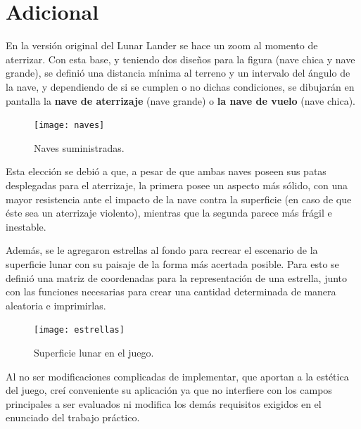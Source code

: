 \documentclass[a4paper, 12pt, spanish]{article}
\begin{document}
\section*{Adicional}
En la versión original del Lunar Lander se hace un zoom al momento de aterrizar. Con esta base, y teniendo dos diseños
para la figura (nave chica y nave grande), se definió una distancia mínima al terreno y un intervalo del ángulo de la nave,
y dependiendo de si se cumplen o no dichas condiciones, se dibujarán en pantalla la \textbf{nave de aterrizaje} (nave grande) 
o \textbf{la nave de vuelo} (nave chica). \bigskip

\begin{figure}[h]
 	\centering
	\texttt{[image: naves]} 
	\caption{Naves suministradas.}
\end{figure}

\bigskip
Esta elección se debió a que, a pesar de que ambas naves poseen sus patas desplegadas para el aterrizaje,
la primera posee un aspecto más sólido, con una mayor resistencia ante el impacto de la nave
contra la superficie (en caso de que éste sea un aterrizaje violento), mientras que la segunda parece más frágil e inestable.
\newline

Además, se le agregaron estrellas al fondo para recrear el escenario de la superficie lunar con su paisaje de la forma más
acertada posible. Para esto se definió una matriz de coordenadas para la representación de una estrella, junto con las funciones necesarias
para crear una cantidad determinada de manera aleatoria e imprimirlas.

\begin{figure}[h!]
 	\centering
	\texttt{[image: estrellas]} 
	\caption{Superficie lunar en el juego.}
\end{figure}
\bigskip

\newpage
Al no ser  modificaciones complicadas de implementar, que aportan a la estética del juego, creí conveniente 
su aplicación ya que no interfiere con los campos principales a ser evaluados ni modifica los demás requisitos
exigidos en el enunciado del trabajo práctico.
\end{document}
